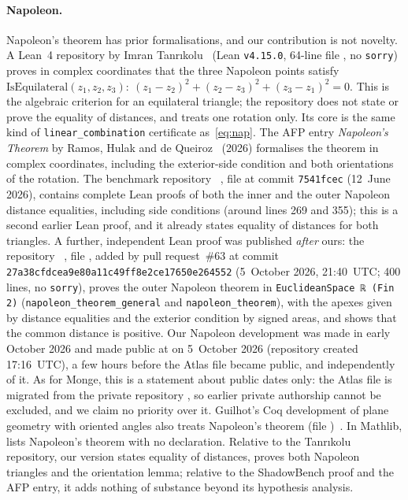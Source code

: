 \documentclass[11pt]{article}
\theoremstyle{definition}
\theoremstyle{remark}
\newcommand{\lean}[1]{\texttt{#1}}
\begin{document}
\paragraph{Napoleon.} Napoleon's theorem has prior formalisations, and our contribution is not
novelty. A Lean~4 repository by Imran Tanr\i{}kolu~\cite{Tanrikolu} (Lean \texttt{v4.15.0}, 64-line
file , no \lean{sorry}) proves in complex coordinates that the three
Napoleon points satisfy
$\mathrm{IsEquilateral}(z_1,z_2,z_3):\ (z_1-z_2)^2+(z_2-z_3)^2+(z_3-z_1)^2=0$. This is the
algebraic criterion for an equilateral triangle; the repository does not state or prove the
equality of distances, and treats one rotation only. Its core is the same kind of
\lean{linear\_combination} certificate as~\eqref{eq:nap}. The AFP entry \emph{Napoleon's
Theorem} by Ramos, Hulak and de Queiroz~\cite{AFPNapoleon} (2026) formalises the theorem in complex
coordinates, including the exterior-side condition and both orientations of the rotation.
The benchmark repository ~\cite{ShadowBench}, file
 at commit
\texttt{7541fcec} (12~June 2026), contains complete Lean proofs of both the inner and the outer
Napoleon distance equalities, including side conditions (around lines 269 and 355); this is a
second earlier Lean proof, and it already states equality of distances for both triangles.
A further, independent Lean proof was published \emph{after} ours: the repository
~\cite{AtlasLeanNapoleon}, file
, added by pull request~\#63 at commit
\texttt{27a38cfdcea9e80a11c49ff8e2ce17650e264552} (5~October 2026, 21:40~UTC; 400 lines, no
\lean{sorry}), proves the outer Napoleon theorem in \lean{EuclideanSpace ℝ (Fin 2)}
(\lean{napoleon\_theorem\_general} and \lean{napoleon\_theorem}), with the apexes given by distance
equalities and the exterior condition by signed areas, and shows that the common distance is
positive. Our Napoleon development was made in early October 2026 and made public at
 on 5~October 2026 (repository created 17:16~UTC), a few hours
before the Atlas file became public, and independently of it. As for Monge, this is a statement
about public dates only: the Atlas file is migrated from the private repository
, so earlier private authorship cannot be excluded, and we claim
no priority over it.
Guilhot's Coq development of plane geometry with oriented angles also treats Napoleon's
theorem (file )~\cite{GuilhotAngles,Guilhot}. In Mathlib,  lists Napoleon's theorem with no
declaration. Relative to the Tanr\i{}kolu repository, our version states equality of distances,
proves both Napoleon triangles and the orientation lemma; relative to the ShadowBench proof and the
AFP entry, it adds nothing of substance beyond its hypothesis analysis.
\end{document}
